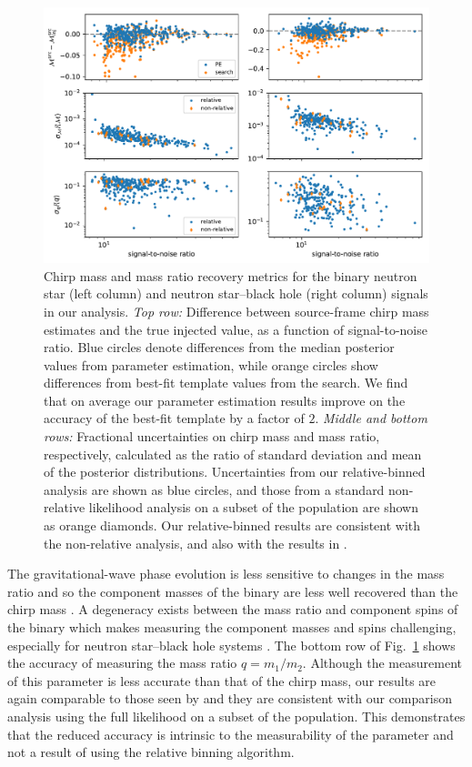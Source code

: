 \begin{figure}[ht]
\includegraphics[width=\textwidth]{Figures/rel-bin-pe/residuals_and_frac_uncertainty_6panel.pdf}
\caption{Chirp mass and mass ratio recovery metrics for the binary neutron star (left column) and neutron star--black hole (right column) signals in our analysis. \textit{Top row:} Difference between source-frame chirp mass estimates and the true injected value, as a function of signal-to-noise ratio. Blue circles denote differences from the median posterior values from parameter estimation, while orange circles show differences from best-fit template values from the search. We find that on average our parameter estimation results improve on the accuracy of the best-fit template by a factor of $2$. \textit{Middle and bottom rows:} Fractional uncertainties on chirp mass and mass ratio, respectively, calculated as the ratio of standard deviation and mean of the posterior distributions. Uncertainties from our relative-binned analysis are shown as blue circles, and those from a standard non-relative likelihood analysis on a subset of the population are shown as orange diamonds. Our relative-binned results are consistent with the non-relative analysis, and also with the results in \cite{Farr:2015lna}.}
\label{fig:residuals_and_uncertainty}
\end{figure}

The gravitational-wave phase evolution is less sensitive to changes in the mass ratio  and so the component masses of the binary are less well recovered than the chirp mass \cite{Cutler:1994ys}. A degeneracy exists between the mass ratio and component spins of the binary which makes measuring the component masses and spins challenging, especially for neutron star--black hole systems \cite{Hannam_2013}. The bottom row of Fig.~\ref{fig:residuals_and_uncertainty} shows the accuracy of measuring the mass ratio $q = m_1/m_2$. Although the measurement of this parameter is less accurate than that of the chirp mass, our results are again comparable to those seen by \cite{Farr:2015lna} and they are consistent with our comparison analysis using the full likelihood on a subset of the population. This demonstrates that the reduced accuracy is intrinsic to the measurability of the parameter and not a result of using the relative binning algorithm.

